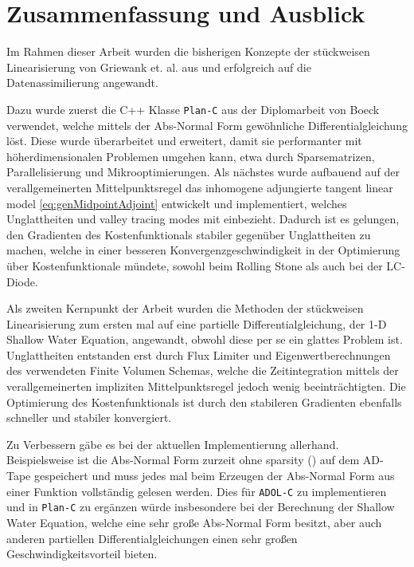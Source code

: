 \chapter{Zusammenfassung und Ausblick}

Im Rahmen dieser Arbeit wurden die bisherigen Konzepte der stückweisen Linearisierung von Griewank et. al. aus \cite{monster} und \cite{plan} erfolgreich auf die Datenassimilierung angewandt.

Dazu wurde zuerst die C++ Klasse \texttt{Plan-C} aus der Diplomarbeit von Boeck \cite{boeck14} verwendet, welche mittels der Abs-Normal Form gewöhnliche Differentialgleichung löst. Diese wurde überarbeitet und erweitert, damit sie performanter mit höherdimensionalen Problemen umgehen kann, etwa durch Sparsematrizen, Parallelisierung und Mikrooptimierungen. Als nächstes wurde aufbauend auf der verallgemeinerten Mittelpunktsregel das inhomogene adjungierte tangent linear model \eqref{eq:genMidpointAdjoint} entwickelt und implementiert, welches Unglattheiten und valley tracing modes mit einbezieht. Dadurch ist es gelungen, den Gradienten des Kostenfunktionals stabiler gegenüber Unglattheiten zu machen, welche in einer besseren Konvergenzgeschwindigkeit in der Optimierung über Kostenfunktionale mündete, sowohl beim Rolling Stone als auch bei der LC-Diode.

Als zweiten Kernpunkt der Arbeit wurden die Methoden der stückweisen Linearisierung zum ersten mal auf eine partielle Differentialgleichung, der 1-D Shallow Water Equation, angewandt, obwohl diese per se ein glattes Problem ist. Unglattheiten entstanden erst durch Flux Limiter und Eigenwertberechnungen des verwendeten Finite Volumen Schemas, welche die Zeitintegration mittels der verallgemeinerten impliziten Mittelpunktsregel jedoch wenig beeinträchtigten. Die Optimierung des Kostenfunktionals ist durch den stabileren Gradienten ebenfalls schneller und stabiler konvergiert.

Zu Verbessern gäbe es bei der aktuellen Implementierung allerhand. Beispielsweise ist die Abs-Normal Form zurzeit ohne sparsity (\cite[S.137 ff.]{griewank2008evaluating}) auf dem AD-Tape gespeichert und muss jedes mal beim Erzeugen der Abs-Normal Form aus einer Funktion vollständig gelesen werden. Dies für \texttt{ADOL-C} zu implementieren und in \texttt{Plan-C} zu ergänzen  würde insbesondere bei der Berechnung der Shallow Water Equation, welche eine sehr große Abs-Normal Form besitzt, aber auch anderen partiellen Differentialgleichungen einen sehr großen Geschwindigkeitsvorteil bieten. 

